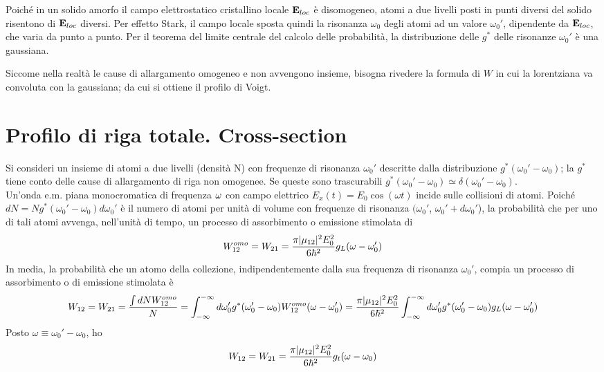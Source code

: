 Poiché in un solido amorfo il campo elettrostatico cristallino locale $\mathbf{E}_{loc}$ è disomogeneo, atomi a due livelli posti in punti diversi del solido risentono di $\mathbf{E}_{loc}$ diversi. Per effetto Stark, il campo locale sposta quindi la risonanza $\omega_0$ degli atomi ad un valore $\omega_0'$, dipendente da $\mathbf{E}_{loc}$, che varia da punto a punto. Per il teorema del limite centrale del calcolo delle probabilità, la distribuzione delle $g^*$ delle risonanze $\omega_0'$ è una gaussiana.

Siccome nella realtà le cause di allargamento omogeneo e non avvengono insieme, bisogna rivedere la formula di $W$ in cui la lorentziana va convoluta con la gaussiana; da cui si ottiene il profilo di Voigt.

\section{Profilo di riga totale. Cross-section}
Si consideri un insieme di atomi a due livelli (densità N) con frequenze di risonanza $\omega_0'$ descritte dalla distribuzione $g^*(\omega_0' - \omega_0)$;
la $g^*$ tiene conto delle cause di allargamento di riga non omogenee. Se queste sono trascurabili $g^*(\omega_0' - \omega_0) \simeq \delta(\omega_0' - \omega_0)$. \\
Un'onda e.m. piana monocromatica di frequenza $\omega$ con campo elettrico $E_x(t) = E_0 \cos(\omega t)$ incide sulle collisioni di atomi. Poiché $dN = Ng^*(\omega_0' - \omega_0) d\omega_0'$ è il numero di atomi per unità di volume con frequenze di risonanza $(\omega_0'$, $\omega_0' + d\omega_0'$), la probabilità che per uno di tali atomi avvenga, nell'unità di tempo, un processo di assorbimento o emissione stimolata di
\begin{equation*}
W_{12}^{omo} = W_{21} = \frac{\pi |\*\mu_{12}|^2 E_0^2}{6\hbar^2} g_L(\omega - \omega_0')
\end{equation*}
In media, la probabilità che un atomo della collezione, indipendentemente dalla sua frequenza di risonanza $\omega_0'$, compia un processo di assorbimento o di emissione stimolata è
\begin{equation*}
W_{12} = W_{21} = \frac{\int dN W_{12}^{omo}}{N} = \int_{-\infty}^{-\infty} d\omega_0' g^*(\omega_0' - \omega_0) W_{12}^{omo}(\omega - \omega_0') = \frac{\pi |\*\mu_{12}|^2 E_0^2}{6\hbar^2} \int_{-\infty}^{-\infty} d\omega_0' g^*(\omega_0' - \omega_0) g_L(\omega - \omega_0')
\end{equation*}
Posto $\omega \equiv \omega_0' - \omega_0$, ho
\begin{equation*}
W_{12} = W_{21} = \frac{\pi |\*\mu_{12}|^2 E_0^2}{6\hbar^2} g_t(\omega - \omega_0)
\end{equation*}
